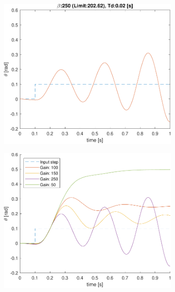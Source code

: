 \begin{figure}[t!]
\begin{subfigure}{0.33\linewidth}
	\includegraphics[width=0.95\linewidth]{../code/stretch/figs/result_gain_250_Td_0.02}
	\caption{}
\end{subfigure}\hfill
	\caption{Variazione della risposta del sistema al variare del guadagno. $\beta =50$ (a); $\beta =150$ (b); $\beta=250$ (c). Si vede come all'aumentare del guadagno si riduce l'angolo di equilibrio ma la risposta diventa oscillatore finoa a divergere (instabilità).}
	\vspace{0.5cm}
	\begin{subfigure}{0.5\linewidth}
		\centering
		\includegraphics[width=0.85\linewidth]{../code/stretch/figs/gainPlot}
		\caption{}
		\label{fig:stretchGain}
	\end{subfigure}\hfill
	\begin{subfigure}{0.5\linewidth}

\end{subfigure}
\end{figure}
